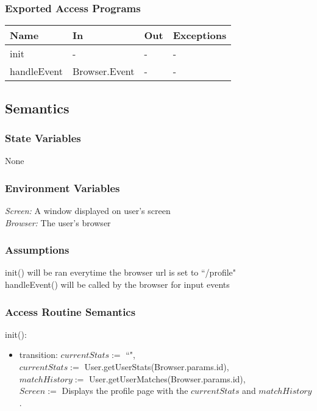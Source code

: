 \documentclass[12pt, titlepage]{article}
\begin{document}
\subsubsection{Exported Access Programs}
\begin{center}
\begin{tabular}{p{2cm} p{4cm} p{4cm} p{2cm}}
\hline
\textbf{Name} & \textbf{In} & \textbf{Out} & \textbf{Exceptions} \\
\hline
init & - & - & - \\
handleEvent & Browser.Event & - & -\\
\hline
\end{tabular}
\end{center}
\subsection{Semantics}
\subsubsection{State Variables}
None
\subsubsection{Environment Variables}
\textit{Screen: } A window displayed on user's screen\\
\textit{Browser: } The user's browser

\subsubsection{Assumptions}

init() will be ran everytime the browser url is set to ``/profile"\\
handleEvent() will be called by the browser for input events

\subsubsection{Access Routine Semantics}
\noindent init():
\begin{itemize}
\item transition: $currentStats :=$ ``",\\
$currentStats :=$ User.getUserStats(Browser.params.id),\\
$matchHistory :=$ User.getUserMatches(Browser.params.id),\\
$Screen :=$ Displays the profile page with the $currentStats$ and $matchHistory$. 
\end{itemize}
\end{document}
